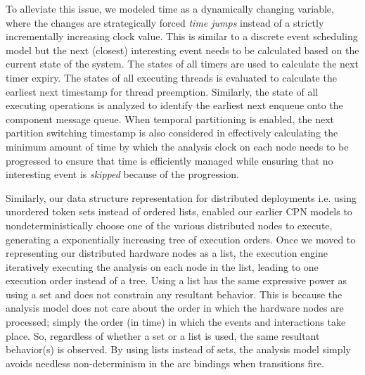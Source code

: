 To alleviate this issue, we modeled time as a dynamically changing variable, where the changes are strategically forced \emph{time jumps} instead of a strictly incrementally increasing clock value. This is similar to a discrete event scheduling model but the next (closest) interesting event needs to be calculated based on the current state of the system. The states of all timers are used to calculate the next timer expiry. The states of all executing threads is evaluated to calculate the earliest next timestamp for thread preemption. Similarly, the state of all executing operations is analyzed to identify the earliest next enqueue onto the component message queue. When temporal partitioning is enabled, the next partition switching timestamp is also considered in effectively calculating the minimum amount of time by which the analysis clock on each node needs to be progressed to ensure that time is efficiently managed while ensuring that no interesting event is \emph{skipped} because of the progression.

Similarly, our data structure representation for distributed deployments i.e. using unordered token sets instead of ordered lists, enabled our earlier CPN models to nondeterministically choose one of the various distributed nodes to execute, generating a exponentially increasing tree of execution orders. Once we moved to representing our distributed hardware nodes as a list, the execution engine iteratively executing the analysis on each node in the list, leading to one execution order instead of a tree. Using a list has the same expressive power as using a set and does not constrain any resultant behavior. This is because the analysis model does not care about the order in which the hardware nodes are processed; simply the order (in time) in which the events and interactions take place. So, regardless of whether a set or a list is used, the same resultant behavior(s) is observed. By using lists instead of sets, the analysis model simply avoids needless non-determinism in the arc bindings when transitions fire. 


